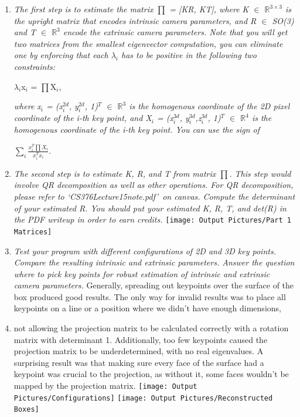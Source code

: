 \documentclass[11pt]{article}
\begin{document}
\begin{enumerate}
        \item \textit{The first step is to estimate the matrix $\prod$ = [KR, KT], where K $\in$
            $\mathbb{R}^{3\times3}$ is the upright matrix that encodes intrinsic camera parameters, and R $\in$ SO(3)
            and T $\in$ $\mathbb{R}^{3}$ encode the extrinsic camera parameters. Note that you will get two matrices
            from the smallest eigenvector computation, you can eliminate one by enforcing that each $\lambda_i$ has
            to be positive in the following two constraints:}
        \begin{center}
            $\lambda_i$x$_i$ = $\prod$X$_i$,
        \end{center}
        \textit{where x$_i$ = (x$_i^{2d}$, y$_i^{2d}$, 1)$^T$ $\in$ $\mathbb{R}^{3}$ is the homogenous coordinate of
        the 2D pixel coordinate of the i-th key point, and X$_i$ = (x$_i^{3d}$, y$_i^{3d}$,z$_i^{3d}$, 1)$^T$ $\in$
            $\mathbb{R}^{4}$ is the homogenous coordinate of the i-th key point. You can use the sign of }
        \begin{center}
            $\sum_{i}\frac{x_{i}^{T}\prod X_{i}}{x_{i}^{T}x_{i}}$.
        \end{center}

        \item \textit{The second step is to estimate K, R, and T from matrix $\prod$. This step would involve QR
        decomposition as well as other operations. For QR decomposition, please refer to
        \textquoteleft CS376Lecture15note.pdf\textquoteright\ on canvas. Compute the determinant of your estimated R.
        You should put your estimated K, R, T, and det(R) in the PDF writeup in order to earn credits.}\newline
        \texttt{[image: Output Pictures/Part 1 Matrices]}\newline

        \item \textit{Test your program with different configurations of 2D and 3D key points. Compare the resulting
        intrinsic and extrinsic parameters. Answer the question where to pick key points for robust estimation of
        intrinsic and extrinsic camera parameters.}\newline
        Generally, spreading out keypoints over the surface of the box produced good results. The only way for
        invalid results was to place all keypoints on a line or a position where we didn't have enough dimensions,
        \item not allowing the projection matrix to be calculated correctly with a rotation matrix with determinant 1.
        Additionally, too few keypoints caused the projection matrix to be underdetermined, with no real eigenvalues.
        A surprising result was that making sure every face of the surface had a keypoint was crucial to the projection,
        as without it, some faces wouldn't be mapped by the projection matrix.\newline
        \texttt{[image: Output Pictures/Configurations]}\newline
        \texttt{[image: Output Pictures/Reconstructed Boxes]}\newline


\end{enumerate}
\end{document}

